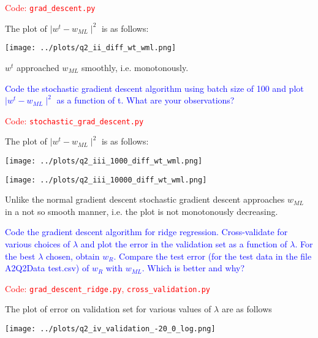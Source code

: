 \textcolor{red}{Code: \texttt{grad\_descent.py}}

The plot of $\mid w^t - w_{ML}\mid ^ 2$ is as follows:

\begin{center}
	\texttt{[image: ../plots/q2\_ii\_diff\_wt\_wml.png]}	
\end{center}

$w^t$ approached $w_{ML}$ smoothly, i.e. monotonously.

\vspace*{24pt}

\textcolor{blue}{Code the stochastic gradient descent algorithm using batch size of 100 and plot $\mid w^t - w_{ML}\mid ^ 2$ as a function of t. What are your observations?}

\textcolor{red}{Code: \texttt{stochastic\_grad\_descent.py}}


The plot of $\mid w^t - w_{ML}\mid ^ 2$ is as follows:

\begin{center}
	\texttt{[image: ../plots/q2\_iii\_1000\_diff\_wt\_wml.png]}	
\end{center}

\begin{center}
	\texttt{[image: ../plots/q2\_iii\_10000\_diff\_wt\_wml.png]}	
\end{center}

Unlike the normal gradient descent stochastic gradient descent approaches $w_{ML}$ in a not so smooth manner, i.e. the plot is not monotonously decreasing.

\pagebreak

\textcolor{blue}{Code the gradient descent algorithm for ridge regression. Cross-validate for various choices of $\lambda$ and plot the error in the validation set as a function of $\lambda$. For the best $\lambda$ chosen, obtain $w_R$. Compare the test error (for the test data in the file A2Q2Data test.csv) of $w_R$ with $w_{ML}$. Which is better and why?}

\textcolor{red}{Code: \texttt{grad\_descent\_ridge.py}, \texttt{cross\_validation.py}}

The plot of error on validation set for various values of $\lambda$ are as follows


\begin{center}
	\texttt{[image: ../plots/q2\_iv\_validation\_-20\_0\_log.png]}	
\end{center}


